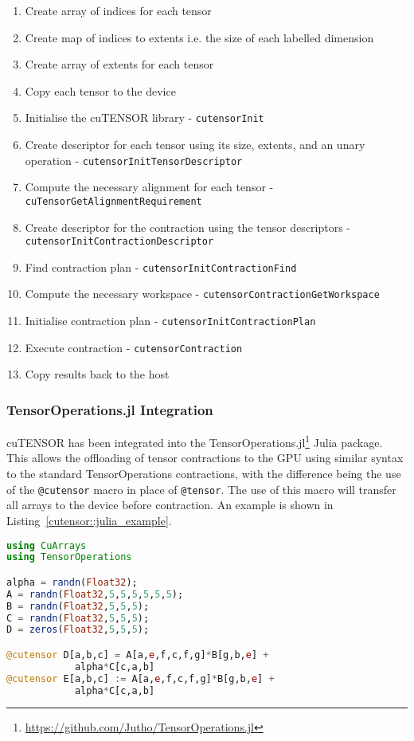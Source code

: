 \documentclass[12pt]{article}
\begin{document}
\begin{enumerate}
\item Create array of indices for each tensor
\item Create map of indices to extents i.e. the size of each labelled dimension
\item Create array of extents for each tensor
\item Copy each tensor to the device
\item Initialise the cuTENSOR library - \texttt{cutensorInit}
\item Create descriptor for each tensor using its size, extents, and an unary operation - \texttt{cutensorInitTensorDescriptor}
\item Compute the necessary alignment for each tensor - \texttt{cuTensorGetAlign\-mentRequirement}
\item Create descriptor for the contraction using the tensor descriptors - \texttt{cutensorInitContractionDescriptor}
\item Find contraction plan - \texttt{cutensorInitContractionFind}
\item Compute the necessary workspace - \texttt{cutensorContractionGetWorksp\-ace}
\item Initialise contraction plan - \texttt{cutensorInitContractionPlan}
\item Execute contraction - \texttt{cutensorContraction}
\item Copy results back to the host
\end{enumerate}

\subsubsection{TensorOperations.jl Integration} \label{cutensor::julia}
cuTENSOR has been integrated into the TensorOperations.jl\footnote{\url{https://github.com/Jutho/TensorOperations.jl}} Julia package. This allows the offloading of tensor contractions to the GPU using similar syntax to the standard TensorOperations contractions, with the difference being the use of the \texttt{@cutensor} macro in place of \texttt{@tensor}. The use of this macro will transfer all arrays to the device before contraction. An example is shown in Listing~\ref{cutensor::julia_example}.

\begin{lstlisting}[language=Julia, label=cutensor::julia_example, caption=cuTENSOR contraction in Julia]
using CuArrays
using TensorOperations

alpha = randn(Float32);
A = randn(Float32,5,5,5,5,5,5);
B = randn(Float32,5,5,5);
C = randn(Float32,5,5,5);
D = zeros(Float32,5,5,5);

@cutensor D[a,b,c] = A[a,e,f,c,f,g]*B[g,b,e] +
			alpha*C[c,a,b]
@cutensor E[a,b,c] := A[a,e,f,c,f,g]*B[g,b,e] +
			alpha*C[c,a,b]
\end{lstlisting}
\end{document}
